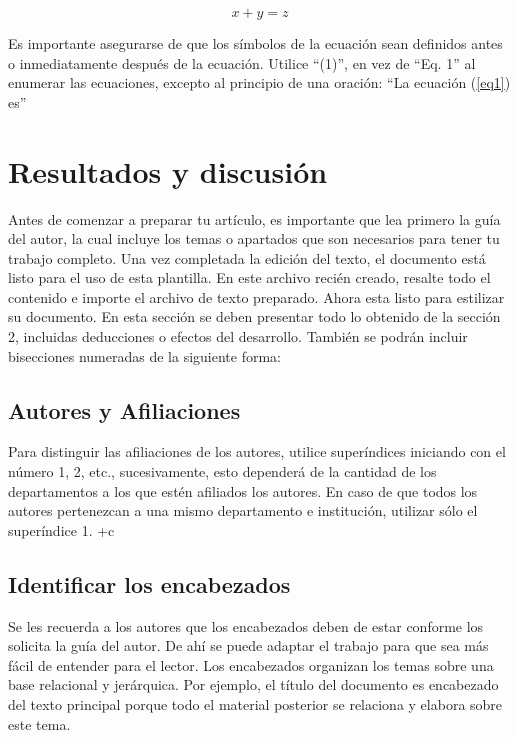\begin{equation}
    \label{eq1}
    x + y = z 
\end{equation}

Es importante asegurarse de que los símbolos de la ecuación sean definidos antes o inmediatamente después de la ecuación. Utilice “(1)”, en vez de “Eq. 1” al enumerar las ecuaciones, excepto al principio de una oración: “La ecuación (\ref{eq1}) es”



\section{Resultados y discusión}

Antes de comenzar a preparar tu artículo, es importante que lea primero la guía del autor, la cual incluye los temas o apartados que son necesarios para tener tu trabajo completo.
Una vez completada la edición del texto, el documento está listo para el uso de esta plantilla. En este archivo recién creado, resalte todo el contenido e importe el archivo de texto preparado. Ahora esta listo para estilizar su documento.
En esta sección se deben presentar todo lo obtenido de la sección 2, incluidas deducciones o efectos del desarrollo. También se podrán incluir bisecciones numeradas de la siguiente forma:

\subsection{Autores y Afiliaciones}

Para distinguir las afiliaciones de los autores, utilice superíndices iniciando con el número 1, 2, etc., sucesivamente, esto dependerá de la cantidad de los departamentos a los que estén afiliados los autores. En caso de que todos los autores pertenezcan a una mismo departamento e institución, utilizar sólo el superíndice 1. 
+c
\subsection{Identificar los encabezados}

Se les recuerda a los autores que los encabezados deben de estar conforme los solicita la guía del autor. De ahí se puede adaptar el trabajo para que sea más fácil de entender para el lector.
Los encabezados organizan los temas sobre una base relacional y jerárquica. Por ejemplo, el título del documento es encabezado del texto principal porque todo el material posterior se relaciona y elabora sobre este tema. 

